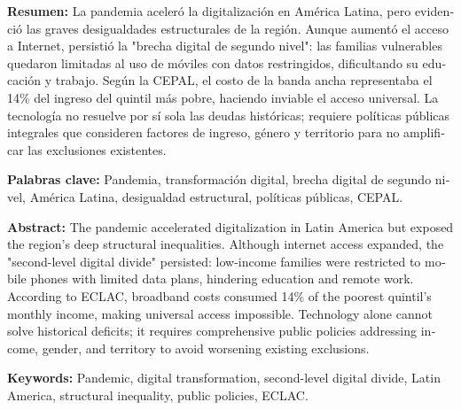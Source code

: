 \begin{tcolorbox}[colback=brown!8!white,colframe=brown!8!white,boxrule=0pt,arc=2pt,left=4pt,right=4pt,top=3pt,bottom=3pt,before skip=4pt,after skip=4pt]
\begin{otherlanguage}{spanish}
\sffamily\small \textbf{Resumen:} La pandemia aceleró la digitalización en América Latina, pero evidenció las graves desigualdades estructurales de la región. Aunque aumentó el acceso a Internet, persistió la "brecha digital de segundo nivel": las familias vulnerables quedaron limitadas al uso de móviles con datos restringidos, dificultando su educación y trabajo. Según la CEPAL, el costo de la banda ancha representaba el 14\% del ingreso del quintil más pobre, haciendo inviable el acceso universal. La tecnología no resuelve por sí sola las deudas históricas; requiere políticas públicas integrales que consideren factores de ingreso, género y territorio para no amplificar las exclusiones existentes.
\par\smallskip\noindent\textbf{Palabras clave:} Pandemia, transformación digital, brecha digital de segundo nivel, América Latina, desigualdad estructural, políticas públicas, CEPAL.
\end{otherlanguage}
\end{tcolorbox}

\begin{tcolorbox}[colback=brown!8!white,colframe=brown!8!white,boxrule=0pt,arc=2pt,left=4pt,right=4pt,top=3pt,bottom=3pt,before skip=4pt,after skip=4pt]
\begin{otherlanguage}{english}
\sffamily\small \textbf{Abstract:} The pandemic accelerated digitalization in Latin America but exposed the region's deep structural inequalities. Although internet access expanded, the "second-level digital divide" persisted: low-income families were restricted to mobile phones with limited data plans, hindering education and remote work. According to ECLAC, broadband costs consumed 14\% of the poorest quintil's monthly income, making universal access impossible. Technology alone cannot solve historical deficits; it requires comprehensive public policies addressing income, gender, and territory to avoid worsening existing exclusions.
\par\smallskip\noindent\textbf{Keywords:} Pandemic, digital transformation, second-level digital divide, Latin America, structural inequality, public policies, ECLAC.
\end{otherlanguage}
\end{tcolorbox}

